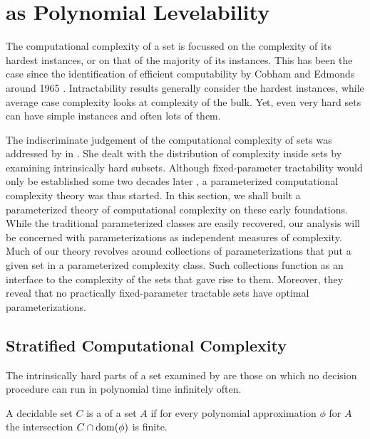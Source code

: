 \section{as Polynomial Levelability}

The computational complexity of a set is focussed on the complexity of its hardest instances, or on that of the majority of its instances.
This has been the case since the identification of efficient computability by Cobham and Edmonds around 1965 \parencite[see][]{goldreich2008computational}.
Intractability results \parencite{cook1971complexity,garey1979computers} generally consider the hardest instances, while average case complexity looks at complexity of the bulk.
Yet, even very hard sets can have simple instances and often lots of them.

The indiscriminate judgement of the computational complexity of sets was addressed by \textcite{lynch1975reducibility} in \citeyear{lynch1975reducibility}.
She dealt with the distribution of complexity inside sets by examining intrinsically hard subsets.
Although fixed-parameter tractability would only be established some two decades later \parencite{downey1992fixed}, a parameterized computational complexity theory was thus started.
In this section, we shall built a parameterized theory of computational complexity on these early foundations.
While the traditional parameterized classes are easily recovered, our analysis will be concerned with parameterizations as independent measures of complexity.
Much of our theory revolves around collections of parameterizations that put a given set in a parameterized complexity class.
Such collections function as an interface to the complexity of the sets that gave rise to them.
Moreover, they reveal that no practically fixed-parameter tractable sets have optimal parameterizations.

\subsection{Stratified Computational Complexity}
The intrinsically hard parts of a set examined by \citeauthor{lynch1975reducibility} are those on which no decision procedure can run in polynomial time infinitely often.
\begin{definition}
  A decidable set $C$ is a  of a set $A$ if for every polynomial approximation $\phi$ for $A$ the intersection $C \cap \operatorname{dom}(\phi)$ is finite.
\end{definition}

